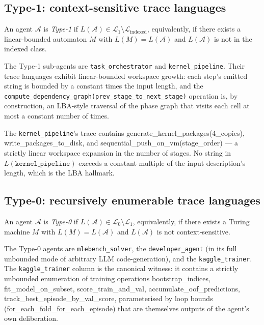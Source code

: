 \subsection{Type-1: context-sensitive trace languages}

\begin{definition}
\label{def:type1agent}
An agent $\mathcal{A}$ is \emph{Type-1} if $L(\mathcal{A}) \in
\mathcal{L}_1 \setminus \mathcal{L}_{\mathrm{indexed}}$,
equivalently, if there exists a linear-bounded automaton $M$
with $L(M) = L(\mathcal{A})$ and $L(\mathcal{A})$ is not in the
indexed class.
\end{definition}

The Type-1 sub-agents are \texttt{task\_orchestrator} and
\texttt{kernel\_pipeline}.  Their trace languages exhibit
linear-bounded workspace growth: each step's emitted string is
bounded by a constant times the input length, and the
\texttt{compute\_dependency\_graph(prev\_stage\_to\_next\_stage)}
operation is, by construction, an LBA-style traversal of the
phase graph that visits each cell at most a constant number of
times.

The \texttt{kernel\_pipeline}'s trace contains
\textsf{generate\_kernel\_packages(4\_copies)},
\textsf{write\_packages\_to\_disk}, and
\textsf{sequential\_push\_on\_vm(stage\_order)} --- a strictly
linear workspace expansion in the number of stages.  No string
in $L(\texttt{kernel\_pipeline})$ exceeds a constant multiple of
the input description's length, which is the LBA hallmark.

\subsection{Type-0: recursively enumerable trace languages}

\begin{definition}
\label{def:type0agent}
An agent $\mathcal{A}$ is \emph{Type-0} if $L(\mathcal{A}) \in
\mathcal{L}_0 \setminus \mathcal{L}_1$, equivalently, if there
exists a Turing machine $M$ with $L(M) = L(\mathcal{A})$ and
$L(\mathcal{A})$ is not context-sensitive.
\end{definition}

The Type-0 agents are \texttt{mlebench\_solver}, the
\texttt{developer\_agent} (in its full unbounded mode of arbitrary
LLM code-generation), and the \texttt{kaggle\_trainer}.  The
\texttt{kaggle\_trainer} column is the canonical witness: it
contains a strictly unbounded enumeration of training operations
\textsf{bootstrap\_indices}, \textsf{fit\_model\_on\_subset},
\textsf{score\_train\_and\_val}, \textsf{accumulate\_oof\_predictions},
\textsf{track\_best\_episode\_by\_val\_score}, parameterised by
loop bounds (\textsf{for\_each\_fold\_for\_each\_episode}) that
are themselves outputs of the agent's own deliberation.

